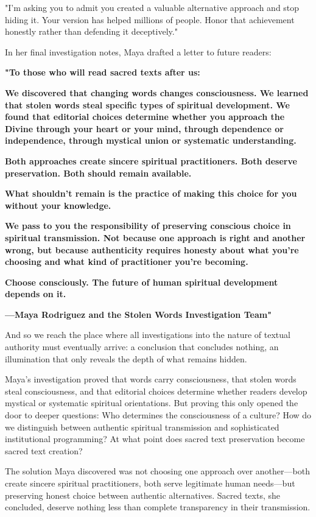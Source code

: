 \documentclass[12pt,twoside]{book}
\begin{document}
"I'm asking you to admit you created a valuable alternative approach and stop hiding it. Your version has helped millions of people. Honor that achievement honestly rather than defending it deceptively."

In her final investigation notes, Maya drafted a letter to future readers:

\textbf{"To those who will read sacred texts after us:}

\textbf{We discovered that changing words changes consciousness. We learned that stolen words steal specific types of spiritual development. We found that editorial choices determine whether you approach the Divine through your heart or your mind, through dependence or independence, through mystical union or systematic understanding.}

\textbf{Both approaches create sincere spiritual practitioners. Both deserve preservation. Both should remain available.}

\textbf{What shouldn't remain is the practice of making this choice for you without your knowledge.}

\textbf{We pass to you the responsibility of preserving conscious choice in spiritual transmission. Not because one approach is right and another wrong, but because authenticity requires honesty about what you're choosing and what kind of practitioner you're becoming.}

\textbf{Choose consciously. The future of human spiritual development depends on it.}

\textbf{—Maya Rodriguez and the Stolen Words Investigation Team"}

And so we reach the place where all investigations into the nature of textual authority must eventually arrive: a conclusion that concludes nothing, an illumination that only reveals the depth of what remains hidden.

Maya's investigation proved that words carry consciousness, that stolen words steal consciousness, and that editorial choices determine whether readers develop mystical or systematic spiritual orientations. But proving this only opened the door to deeper questions: Who determines the consciousness of a culture? How do we distinguish between authentic spiritual transmission and sophisticated institutional programming? At what point does sacred text preservation become sacred text creation?

The solution Maya discovered was not choosing one approach over another—both create sincere spiritual practitioners, both serve legitimate human needs—but preserving honest choice between authentic alternatives. Sacred texts, she concluded, deserve nothing less than complete transparency in their transmission.
\end{document}
